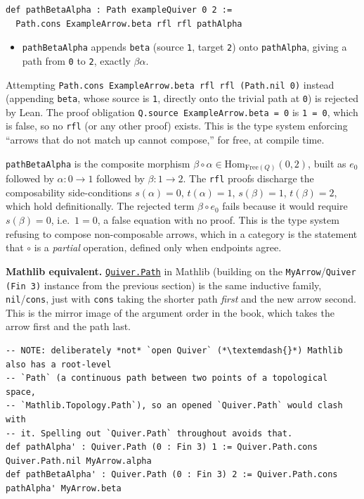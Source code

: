 \begin{lstlisting}
def pathBetaAlpha : Path exampleQuiver 0 2 :=
  Path.cons ExampleArrow.beta rfl rfl pathAlpha
\end{lstlisting}

\begin{itemize}
\tightlist
\item
  \texttt{pathBetaAlpha} appends \texttt{beta} (source \texttt{1}, target \texttt{2}) onto \texttt{pathAlpha}, giving a path from \texttt{0} to \texttt{2}, exactly \(\beta\alpha\).
\end{itemize}

Attempting \texttt{Path.cons ExampleArrow.beta rfl rfl (Path.nil 0)} instead (appending \texttt{beta}, whose source is \texttt{1}, directly onto the trivial path at \texttt{0}) is rejected by Lean. The proof obligation \texttt{Q.source ExampleArrow.beta = 0} is \texttt{1 = 0}, which is false, so no \texttt{rfl} (or any other proof) exists. This is the type system enforcing ``arrows that do not match up cannot compose,'' for free, at compile time.

\begin{mathreading}

\texttt{pathBetaAlpha} is the composite morphism \(\beta\circ\alpha \in \mathrm{Hom}_{\mathrm{Free}(Q)}(0,2)\), built as \(e_0\) followed by \(\alpha : 0\to 1\) followed by \(\beta : 1\to 2\). The \texttt{rfl} proofs discharge the composability side-conditions \(s(\alpha)=0\), \(t(\alpha)=1\), \(s(\beta)=1\), \(t(\beta)=2\), which hold definitionally. The rejected term \(\beta\circ e_0\) fails because it would require \(s(\beta) = 0\), i.e.~\(1 = 0\), a false equation with no proof. This is the type system refusing to compose non-composable arrows, which in a category is the statement that \(\circ\) is a \emph{partial} operation, defined only when endpoints agree.

\end{mathreading}

\textbf{Mathlib equivalent.} \href{https://loogle.lean-lang.org/?q=Quiver.Path}{\texttt{Quiver.Path}} in Mathlib (building on the \texttt{MyArrow}/\texttt{Quiver (Fin 3)} instance from the previous section) is the same inductive family, \texttt{nil}/\texttt{cons}, just with \texttt{cons} taking the shorter path \emph{first} and the new arrow second. This is the mirror image of the argument order in the book, which takes the arrow first and the path last.

\begin{lstlisting}
-- NOTE: deliberately *not* `open Quiver` (*\textemdash{}*) Mathlib also has a root-level
-- `Path` (a continuous path between two points of a topological space,
-- `Mathlib.Topology.Path`), so an opened `Quiver.Path` would clash with
-- it. Spelling out `Quiver.Path` throughout avoids that.
def pathAlpha' : Quiver.Path (0 : Fin 3) 1 := Quiver.Path.cons Quiver.Path.nil MyArrow.alpha
def pathBetaAlpha' : Quiver.Path (0 : Fin 3) 2 := Quiver.Path.cons pathAlpha' MyArrow.beta
\end{lstlisting}

